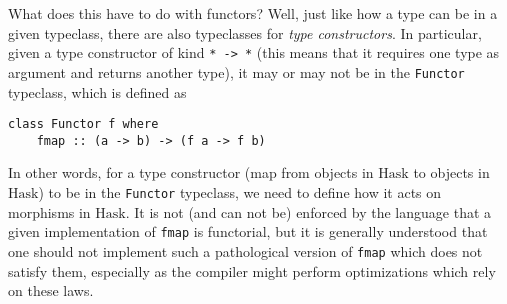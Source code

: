 \documentclass[11	pt]{article}
\theoremstyle{nonumberplain}
\newcommand{\Hask}{\mathrm{Hask}}
\newcommand*\lsin{\lstinline}
\begin{document}
What does this have to do with functors? Well, just like how a type can be in a given typeclass, there are also typeclasses for \emph{type constructors}. In particular, given a type constructor of kind \lsin|* -> *| (this means that it requires one type as argument and returns another type), it may or may not be in the \lsin|Functor| typeclass, which is defined as
\begin{lstlisting}
class Functor f where
	fmap :: (a -> b) -> (f a -> f b)
\end{lstlisting}

In other words, for a type constructor (map from objects in $\Hask$ to objects in $\Hask$) to be in the \lsin|Functor| typeclass, we need to define how it acts on morphisms in $\Hask$. It is not (and can not be) enforced by the language that a given implementation of \lsin|fmap| is functorial, but it is generally understood that one should not implement such a pathological version of \lsin|fmap| which does not satisfy them, especially as the compiler might perform optimizations which rely on these laws.
\end{document}
